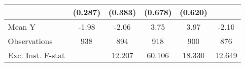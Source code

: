 {\begin{tabular}{l*{5}{c}}
            &     (0.287)         &     (0.383)         &     (0.678)         &     (0.620)         &                     \\
\midrule
Mean Y      &       -1.98         &       -2.06         &        3.75         &        3.97         &       -2.10         \\
Observations&         938         &         894         &         918         &         900         &         876         \\
Exc. Inst. F-stat&                     &      12.207         &      60.106         &      18.330         &      12.649         \\
\bottomrule
\end{tabular}
}
